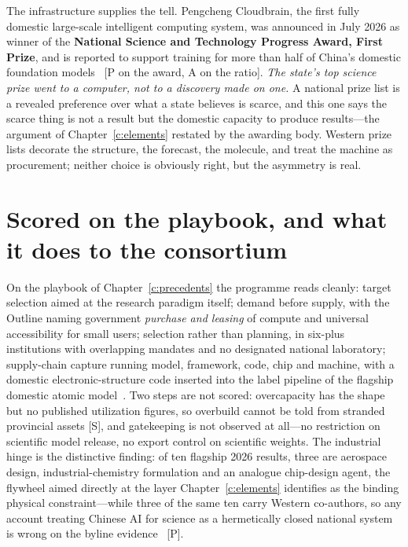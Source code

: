 The infrastructure supplies the tell. Pengcheng Cloudbrain, the first fully domestic large-scale intelligent computing system, was announced in July 2026 as winner of the \textbf{National Science and Technology Progress Award, First Prize}, and is reported to support training for more than half of China's domestic foundation models~\cite{pengcheng-cloudbrain} [P on the award, A on the ratio]. \emph{The state's top science prize went to a computer, not to a discovery made on one.} A national prize list is a revealed preference over what a state believes is scarce, and this one says the scarce thing is not a result but the domestic capacity to produce results---the argument of Chapter~\ref{c:elements} restated by the awarding body. Western prize lists decorate the structure, the forecast, the molecule, and treat the machine as procurement; neither choice is obviously right, but the asymmetry is real.

\section{Scored on the playbook, and what it does to the consortium}

On the playbook of Chapter~\ref{c:precedents} the programme reads cleanly: target selection aimed at the research paradigm itself; demand before supply, with the Outline naming government \emph{purchase and leasing} of compute and universal accessibility for small users; selection rather than planning, in six-plus institutions with overlapping mandates and no designated national laboratory; supply-chain capture running model, framework, code, chip and machine, with a domestic electronic-structure code inserted into the label pipeline of the flagship domestic atomic model~\cite{fyp15-ai4s,deepmodeling,ai4s-industrial}. Two steps are not scored: overcapacity has the shape but no published utilization figures, so overbuild cannot be told from stranded provincial assets [S], and gatekeeping is not observed at all---no restriction on scientific model release, no export control on scientific weights. The industrial hinge is the distinctive finding: of ten flagship 2026 results, three are aerospace design, industrial-chemistry formulation and an analogue chip-design agent, the flywheel aimed directly at the layer Chapter~\ref{c:elements} identifies as the binding physical constraint---while three of the same ten carry Western co-authors, so any account treating Chinese AI for science as a hermetically closed national system is wrong on the byline evidence~\cite{ai4s-industrial} [P].

